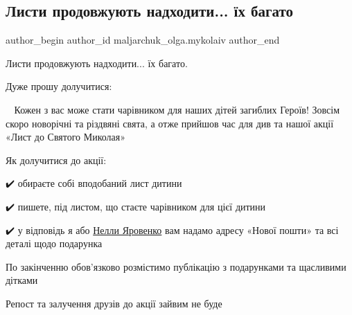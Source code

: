  
 
 
 
 
 
\subsection{Листи продовжують надходити... їх багато}
\label{sec:20_12_2022.fb.maljarchuk_olga.mykolaiv.1.lysty}
 
\ifcmt
 author_begin
   author_id maljarchuk_olga.mykolaiv
 author_end
\fi

Листи продовжують надходити... їх багато.

Дуже прошу долучитися:

💫✨ Кожен з вас може стати чарівником для наших дітей загиблих Героїв! Зовсім
скоро новорічні та різдвяні свята, а отже прийшов час для див та нашої акції
«Лист до Святого Миколая» 💌 

Як долучитися до акції:

✔️ обираєте собі вподобаний лист дитини\par
✔️ пишете, під листом, що стаєте чарівником для цієї дитини\par
✔️ у відповідь я або \href{https://www.facebook.com/nelli4ka6939}{Нелли Яровенко} вам надамо адресу «Нової пошти» та всі деталі щодо подарунка\par

По закінченню обов'язково розмістимо публікацію з подарунками та щасливими дітками 💫

Репост та залучення друзів до акції зайвим не буде 🤗
